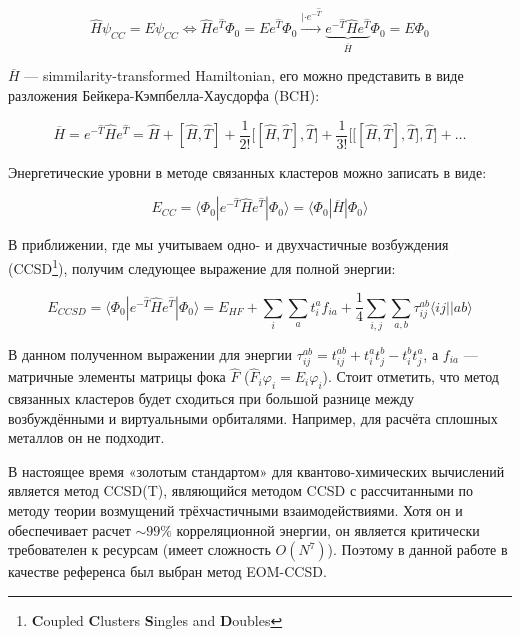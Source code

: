 \documentclass[a4paper,12pt]{article}
\newcommand{\Lrarr}{\Leftrightarrow}
\begin{document}
\begin{onehalfspace}
	\begin{equation}
		\hat H \psi_{CC} = E\psi_{CC} \Lrarr \hat H e^{\hat T}\Phi_0 = E e^{\hat T}\Phi_0 \xrightarrow[]{|\cdot e^{-\hat T}} \underbrace{e^{-\hat T} \hat H e^{\hat T}}_{\overline H} \Phi_0 = E \Phi_0
	\end{equation}
	
	$\overline H$ — simmilarity-transformed Hamiltonian, его можно представить в виде разложения Бейкера-Кэмпбелла-Хаусдорфа (BCH):
	
	\begin{equation}
		\label{eq_BCH}
		\overline H = e^{-\hat T} \hat H e^{\hat T} = \hat H + [\hat H, \hat T] + \frac1{2!}\big[[\hat H, \hat T], \hat T\big] + \frac1{3!}\Big[\big[[\hat H, \hat T], \hat T\big], \hat T\Big] + \dots
	\end{equation}
	
	Энергетические уровни в методе связанных кластеров можно записать в виде:
	
	\begin{equation}
		E_{CC} = \langle\Phi_0|e^{-\hat T}\hat H e^{\hat T}|\Phi_0\rangle = \langle\Phi_0|\overline H|\Phi_0\rangle 
	\end{equation}
	
	В приближении, где мы учитываем одно- и двухчастичные возбуждения (CCSD\footnote{\textbf{C}oupled \textbf{C}lusters \textbf{S}ingles and \textbf{D}oubles}), получим следующее выражение для полной энергии:
	
	\begin{equation}
		E_{CCSD}= \langle\Phi_0|e^{-\hat T}\hat H e^{\hat T}|\Phi_0\rangle = E_{HF} + \sum_{i}\sum_{a}t_{i}^{a}f_{ia} + \frac14 \sum_{i,j}\sum_{a,b}\tau_{ij}^{ab}\langle ij||ab\rangle
	\end{equation}
	
	В данном полученном выражении для энергии $\tau_{ij}^{ab} = t_{ij}^{ab} + t_i^at_j^b - t_i^bt_j^a$, а $f_{ia}$ — матричные элементы матрицы фока $\hat F$ ($\hat F_i \varphi_i = E_i \varphi_i$). Стоит отметить, что метод связанных кластеров будет сходиться при большой разнице между возбуждёнными и виртуальными орбиталями. Например, для расчёта сплошных металлов он не подходит.
	
	В настоящее время «золотым стандартом» для квантово-химических вычислений является метод CCSD(T), являющийся методом CCSD с рассчитанными по методу теории возмущений трёхчастичными взаимодействиями. Хотя он и обеспечивает расчет $\sim99\%$ корреляционной энергии, он является критически требователен к ресурсам (имеет сложность $O(N^7)$). Поэтому в данной работе в качестве референса был выбран метод EOM-CCSD.
	

\end{onehalfspace}
\end{document}
